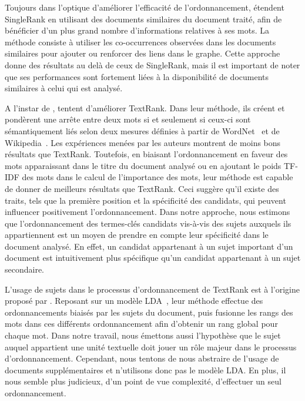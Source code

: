     Toujours dans l'optique d'améliorer l'efficacité de l'ordonnancement,
     étendent SingleRank en utilisant des documents
    similaires du document traité, afin de bénéficier d'un plus grand nombre
    d'informations relatives à ses mots. La méthode consiste à utiliser les
    co-occurrences observées dans les documents similaires pour ajouter ou
    renforcer des liens dans le graphe. Cette approche donne des résultats au
    delà de ceux de SingleRank, mais il est important de noter que ses
    performances sont fortement liées à la disponibilité de documents similaires
    à celui qui est analysé.

    A l'instar de ,
     tentent d'améliorer TextRank. Dans
    leur méthode, ils créent et pondèrent une arrête entre deux mots si et
    seulement si ceux-ci sont sémantiquement liés selon deux mesures définies à
    partir de WordNet~\cite{miller1995wordnet} et de
    Wikipedia~\cite{milne2008wikipediasemanticrelatedness}. Les expériences
    menées par les auteurs montrent de moins bons résultats que TextRank.
    Toutefois, en biaisant l'ordonnancement en faveur des mots apparaissant dans
    le titre du document analysé ou en ajoutant le poids TF-IDF des mots dans le
    calcul de l'importance des mots, leur méthode est capable de donner de
    meilleurs résultats que TextRank. Ceci suggère qu'il existe des traits, tels
    que la première position et la spécificité des candidats, qui peuvent
    influencer positivement l'ordonnancement. Dans notre approche, nous estimons
    que l'ordonnancement des termes-clés candidats vis-à-vis des sujets auxquels
    ils appartiennent est un moyen de prendre en compte leur spécificité dans le
    document analysé. En effet, un candidat appartenant à un sujet important
    d'un document est intuitivement plus spécifique qu'un candidat appartenant à
    un sujet secondaire.

    L'usage de sujets dans le processus d'ordonnancement de TextRank est à
    l'origine proposé par . Reposant sur un
    modèle LDA~\cite[Latent Dirichlet Allocation]{blei2003lda}, leur méthode
    effectue des ordonnancements biaisés par les sujets du document, puis
    fusionne les rangs des mots dans ces différents ordonnancement afin
    d'obtenir un rang global pour chaque mot. Dans notre travail, nous émettons
    aussi l'hypothèse que le sujet auquel appartient une unité textuelle doit
    jouer un rôle majeur dans le processus d'ordonnancement. Cependant, nous
    tentons de nous abstraire de l'usage de documents supplémentaires et
    n'utilisons donc pas le modèle LDA. En plus, il nous semble plus judicieux,
    d'un point de vue complexité, d'effectuer un seul ordonnancement.

